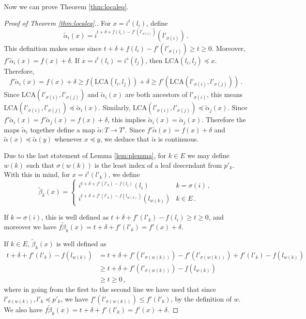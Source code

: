 \documentclass{article}
\theoremstyle{definition}
\newcommand{\LCA}{\mathrm{LCA}}
\begin{document}
Now we can prove Theorem \ref{thm:localeq}.
\begin{proof}[Proof of Theorem \ref{thm:localeq}.] For $x = i^t(l_i)$, define
\begin{equation*}
    \widetilde{\alpha}_i(x) = i^{t + \delta +  f(l_i) - f'(l'_{\sigma(i)})}(l'_{\sigma(i)})\,.
\end{equation*}
This definition makes sense since $t + \delta +  f(l_i) - f'(l'_{\sigma(i)}) \geq t \geq 0$. Moreover, $f'\widetilde{\alpha}_i(x) = f(x) + \delta$.
If $x = i^t(l_i) = i^s(l_j)$, then $\LCA(l_i,l_j) \preceq x$. Therefore,
\begin{equation*}
    f'\widetilde{\alpha}_i(x) = f(x) + \delta \geq f(\LCA(l_i,l_j)) + \delta \geq f'(\LCA(l'_{\sigma(i)}, l'_{\sigma(j)}))\,.
\end{equation*}
Since $\LCA(l'_{\sigma(i)}, l'_{\sigma(j)})$ and $\widetilde{\alpha}_i(x)$ are both ancestors of $l'_{\sigma(i)}$, this means $\LCA(l'_{\sigma(i)}, l'_{\sigma(j)}) \preceq \widetilde{\alpha}_i(x)$. Similarly, $\LCA(l'_{\sigma(i)}, l'_{\sigma(j)}) \preceq \widetilde{\alpha}_j(x)$. Since $f'\widetilde{\alpha}_i(x) = f'\widetilde{\alpha}_j(x) = f(x) + \delta$, this implies $\widetilde{\alpha}_i(x) = \widetilde{\alpha}_j(x)$. Therefore the maps $\widetilde{\alpha}_i$ together define a map $\widetilde{\alpha}: T \to T'$. Since $f'\widetilde\alpha(x) = f(x) + \delta$ and $\widetilde\alpha(x) \preceq \widetilde\alpha(y)$ whenever $x \preceq y$, we deduce that $\widetilde\alpha$ is continuous.

Due to the last statement of Lemma \ref{lem:plemma}, for $k \in E$ we may define $w(k)$ such that $\sigma(w(k))$ is the least index of a leaf descendant from $p'_k$. With this in mind, for $x = i^t(l'_k)$, we define
\begin{equation*}
    \widetilde{\beta}_k(x) = \begin{cases}
        i^{t + \delta + f'(l'_k) - f(l_i)}(l_i)& k = \sigma(i)\,,\\
        i^{t + \delta + f'(l'_k) - f(l_{w(k)})}(l_{w(k)})& k \in E\,.
    \end{cases}
\end{equation*}

If $k = \sigma(i)$, this is well defined as $t + \delta + f'(l'_k) - f(l_i) \geq t \geq 0$, and moreover we have $f\widetilde{\beta}_k(x) = t + \delta + f'(l'_k) = f'(x) + \delta$.

If $k \in E$, $\widetilde\beta_k(x)$ is well defined as
\begin{align*}
    t + \delta + f'(l'_k) - f(l_{w(k)}) &= t + \delta + f'(l'_{\sigma(w(k))}) - f'(l'_{\sigma(w(k))}) + f'(l'_k) - f(l_{w(k)})\\
    &\geq t + \delta + f'(l'_{\sigma(w(k))}) - f(l_{w(k)})\\
    &\geq t \geq 0\,,
\end{align*}
where in going from the first to the second line we have used that since $l'_{\sigma(w(k))}, l'_k\preceq p'_k$, we have $f'(l'_{\sigma(w(k))}) \leq f'(l'_k)$, by the definition of $w$. We also have $f\widetilde\beta_k(x) = t + \delta + f'(l'_{k}) = f'(x) + \delta$.


\end{proof}
\end{document}
